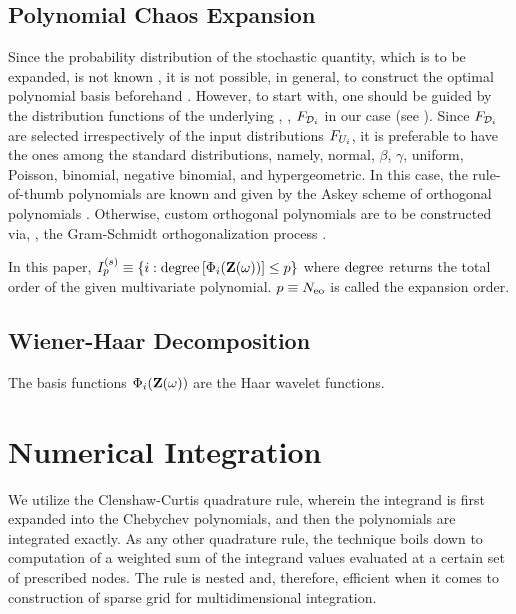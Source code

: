 \subsection{Polynomial Chaos Expansion}
Since the probability distribution of the stochastic quantity, which is to be expanded, is not known \apriori, it is not possible, in general, to construct the optimal polynomial basis beforehand \cite{maitre2010}. However, to start with, one should be guided by the distribution functions of the underlying \rvs, \ie, $F_{\mathcal{D}_i}$ in our case (see ). Since $F_{\mathcal{D}_i}$ are selected irrespectively of the input distributions $F_{U_i}$, it is preferable to have the ones among the standard distributions, namely, normal, $\beta$, $\gamma$,  uniform, Poisson, binomial, negative binomial, and hypergeometric. In this case, the rule-of-thumb polynomials are known and given by the Askey scheme of orthogonal polynomials \cite{xiu2002}. Otherwise, custom orthogonal polynomials are to be constructed via, \eg, the Gram-Schmidt orthogonalization process \cite{witteveen2006}.

In this paper, $\iExpansion_p \equiv \{ i: \oTO{\generalBasis_i(\vZ(\o))} \leq p \}$ where $\oTO$ returns the total order of the given multivariate polynomial. $p \equiv {N_\text{eo}}$ is called the expansion order.

\subsection{Wiener-Haar Decomposition}
The basis functions $\Phi_i(\mathbf{Z}(\omega))$ are the Haar wavelet functions.

\section{Numerical Integration}
We utilize the Clenshaw-Curtis quadrature rule, wherein the integrand is first expanded into the Chebychev polynomials, and then the polynomials are integrated exactly. As any other quadrature rule, the technique boils down to computation of a weighted sum of the integrand values evaluated at a certain set of prescribed nodes. The rule is nested and, therefore, efficient when it comes to construction of sparse grid for multidimensional integration.
